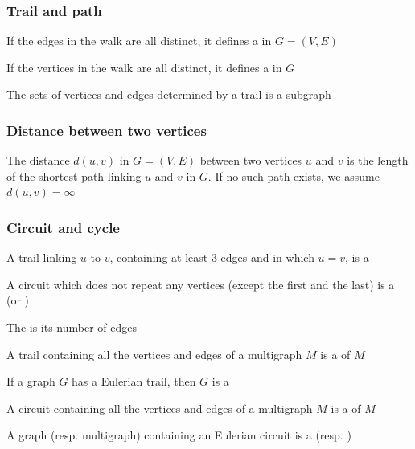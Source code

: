 \documentclass[aspectratio=43]{beamer}
\begin{document}
\begin{frame}\frametitle{Trail and path}
\begin{definition}[{Trail}]
If the edges in the walk are all distinct, it defines a  in $G=(V,E)$
\end{definition}
\vfill
\begin{definition}[{Path}]
If the vertices in the walk are all distinct, it defines a  in $G$
\end{definition}
\vfill
The sets of vertices and edges determined by a trail is a subgraph
\end{frame}


\begin{frame}\frametitle{Distance between two vertices}
\begin{definition}
The distance $d(u,v)$ in $G=(V,E)$ between two vertices $u$ and $v$ is the length of the shortest path linking $u$ and $v$ in $G$. If no such path exists, we assume $d(u,v)=\infty$
\end{definition}
\end{frame}


\begin{frame}\frametitle{Circuit and cycle}
\begin{definition}[Circuit]
A trail linking $u$ to $v$, containing at least 3 edges and in which $u=v$, is a 
\end{definition}
\vfill
\begin{definition}[Cycle]
A circuit which does not repeat any vertices (except the first and the last) is a  (or )
\end{definition}
\vfill
\begin{definition}
The  is its number of edges
\end{definition}
\end{frame}


\begin{frame}
\begin{definition}
	A trail containing all the vertices and edges of a multigraph $M$ is a  of $M$
\end{definition}
\vfill
\begin{definition}
	If a graph $G$ has a Eulerian trail, then $G$ is a 
\end{definition}
\vfill
\begin{definition}
	A circuit containing all the vertices and edges of a multigraph $M$ is a  of $M$
\end{definition}
\vfill
\begin{definition}
	A graph (resp. multigraph) containing an Eulerian circuit is a  (resp. )
\end{definition}
\end{frame}
\end{document}
